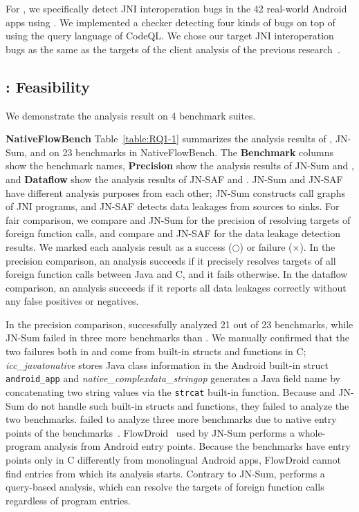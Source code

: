 For , we specifically detect JNI interoperation bugs in the 42 real-world Android
apps using \ours. We implemented a checker detecting four kinds of
bugs on top of \ours using the query language of CodeQL. We chose our target
JNI interoperation bugs as the same as the targets of the client
analysis of the previous research~\cite{LeeASE20, ILEA}.

\subsection{: Feasibility}
We demonstrate the analysis result on 4 benchmark suites.

\textbf{NativeFlowBench} Table~\ref{table:RQ1-1} summarizes the analysis results of \ours, JN-Sum,
and \jnsaf on 23 benchmarks in NativeFlowBench.
The {\bf Benchmark} columns show the benchmark names,
{\bf Precision} show the analysis results of 
JN-Sum and \ours, and {\bf Dataflow} show the analysis results of JN-SAF and \ours.
JN-Sum and JN-SAF have different analysis purposes from
each other; JN-Sum constructs call graphs of JNI programs, and JN-SAF
detects data leakages from sources to sinks.  For fair comparison, we compare
\ours and JN-Sum for the precision of resolving targets of foreign
function calls, and compare \ours and JN-SAF for the data leakage detection results.
We marked each analysis result as a success ($\bigcirc$) or failure ($\times$).
In the precision comparison, an analysis succeeds if
it precisely resolves targets of all foreign function calls between Java and C, and it fails otherwise.
In the dataflow comparison, an analysis succeeds
if it reports all data leakages correctly without any false positives or negatives.


In the precision comparison, \ours successfully analyzed 21 out of 23
benchmarks, while JN-Sum failed in three more benchmarks than \ours.
We manually confirmed that the two failures both in \lees and \ours
come from built-in structs and functions in C; {\it
icc\_javatonative} stores Java class information in the Android built-in
struct {\tt android\_app} and {\it native\_complexdata\_stringop} generates
a Java field name by concatenating two string values via the {\tt strcat} built-in function.
  Because \ours and JN-Sum do not handle such built-in
structs and functions, they failed to analyze the two benchmarks.
  \lees failed to analyze three more benchmarks due to native entry points
of the benchmarks~\cite{nativeactivity}.
  FlowDroid~\cite{Flowdroid} used by JN-Sum performs a whole-program
analysis from Android entry points. 
  Because the benchmarks have entry points only in C differently from monolingual
Android apps, FlowDroid cannot find entries from which its analysis starts.
  Contrary to JN-Sum, \ours performs a query-based
analysis, which can resolve the targets of foreign function calls regardless of program entries.

